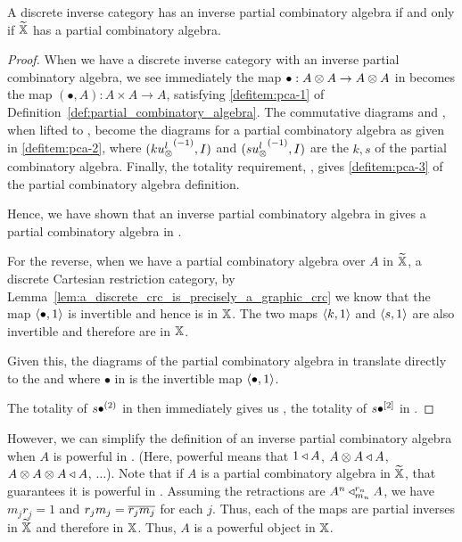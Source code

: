 \begin{proposition}\label{prop:inverse-pca-iff-pca}
  A discrete inverse category \X has an inverse partial combinatory algebra if and only if $\widetilde{\mathbb{X}}$ has
  a partial combinatory algebra.
\end{proposition}
\begin{proof}
  When we have a discrete inverse category \X with an inverse partial combinatory algebra, we see
  immediately the map $\bullet:A\otimes A\to A\otimes A$ in \X becomes the map $(\bullet,A):A\times A \to A$,
  satisfying \ref{defitem:pca-1} of Definition~\ref{def:partial_combinatory_algebra}. The
  commutative diagrams  and , when lifted to \Xt, become the diagrams
  for a partial combinatory algebra as given in \ref{defitem:pca-2}, where $(k{u_{\otimes}^l}^{(-1)}, I)$ and
  $(s{u_{\otimes}^l}^{(-1)}, I)$ are the $k,s$ of the partial combinatory algebra. Finally, the totality
  requirement, , gives \ref{defitem:pca-3} of the partial combinatory algebra
  definition.

  Hence, we have shown that an inverse partial combinatory algebra in \X gives a partial combinatory
  algebra in \Xt.

  For the reverse, when we have a partial combinatory algebra over $A$ in $\widetilde{\mathbb{X}}$, a discrete Cartesian
  restriction category, by Lemma~\ref{lem:a_discrete_crc_is_precisely_a_graphic_crc} we know that
  the map $\langle\bullet,1\rangle$ is invertible and hence is in $\mathbb{X}$. The two maps $\langle k,1\rangle$ and $\langle s,1\rangle$
  are also invertible and therefore are in $\mathbb{X}$.

  Given this, the diagrams of the partial combinatory algebra in \Xt translate directly to the
   and  where $\bullet$ in \X is the invertible map $\langle\bullet,1\rangle$.

  The totality  of $s {\bullet}^{(2)}$ in \Xt then immediately gives us , the
  totality of $s {\bullet}^{[2]}$ in \X.


\end{proof}

However, we can simplify the definition of an inverse partial combinatory algebra when $A$ is
powerful in \X. (Here, powerful means that $1\triangleleft A$, $A\otimes A\triangleleft A$, $A\otimes A\otimes A\triangleleft A$,
$\ldots$). Note that if $A$ is a partial combinatory algebra in $\widetilde{\mathbb{X}}$, that guarantees it is
powerful in \Xt. Assuming the retractions are $A^n \triangleleft_{m_n}^{r_n} A$, we have $m_j r_j =
1$ and $r_j m_j = \overline{r_j m_j}$ for each $j$. Thus, each of the maps are partial inverses in
$\widetilde{\mathbb{X}}$ and therefore in $\mathbb{X}$. Thus, $A$ is a powerful object in $\mathbb{X}$.


